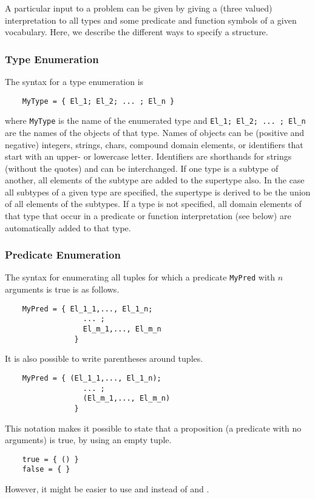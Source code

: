 \documentclass[a4]{article}
\begin{document}
A particular input to a problem can be given by giving a (three valued) interpretation to all types and some predicate and function symbols of a given vocabulary. Here, we describe the different ways to specify a structure.

\subsubsection{Type Enumeration}
The syntax for a type enumeration is 
\begin{lstlisting}
	MyType = { El_1; El_2; ... ; El_n }
\end{lstlisting}
where {\tt MyType} is the name of the enumerated type and {\tt El\_1; El\_2; ... ; El\_n } are the names of the objects of that type. Names of objects can be (positive and negative) integers, strings, chars, compound domain elements, or identifiers that start with an upper- or lowercase letter. 
Identifiers are shorthands for strings (without the quotes) and can be interchanged.
If one type is a subtype of another, all elements of the subtype are added to the supertype also.  In the case all subtypes of a given type are specified, the supertype is derived to be the union of all elements of the subtypes.  If a type is not specified, all domain elements of that type that occur in a predicate or function interpretation (see below) are automatically added to that type.  


\subsubsection{Predicate Enumeration}
The syntax for enumerating all tuples for which a predicate {\tt MyPred} with $n$ arguments is true is as follows.
\begin{lstlisting}
	MyPred = { El_1_1,..., El_1_n; 
				  ... ; 
				  El_m_1,..., El_m_n 
				}
\end{lstlisting}

It is also possible to write parentheses around tuples.
\begin{lstlisting}
	MyPred = { (El_1_1,..., El_1_n); 
				  ... ; 
				  (El_m_1,..., El_m_n) 
				}
\end{lstlisting}
This notation makes it possible to state that a proposition (a predicate with no arguments) is true, by using an empty tuple.
\begin{lstlisting}
	true = { () }
	false = { }
\end{lstlisting}
However, it might be easier to use  and  instead of \code{\{ () \}} and \code{\{\}}.
\end{document}
